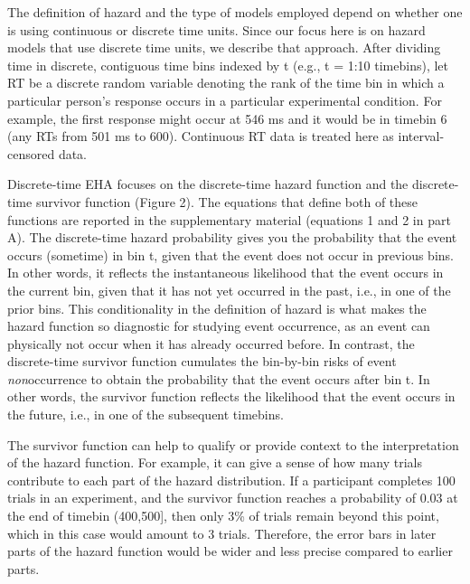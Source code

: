 \documentclass[
  man,floatsintext]{apa6}
\begin{document}
The definition of hazard and the type of models employed depend on whether one is using continuous or discrete time units. Since our focus here is on hazard models that use discrete time units, we describe that approach. After dividing time in discrete, contiguous time bins indexed by t (e.g., t = 1:10 timebins), let RT be a discrete random variable denoting the rank of the time bin in which a particular person's response occurs in a particular experimental condition. For example, the first response might occur at 546 ms and it would be in timebin 6 (any RTs from 501 ms to 600). Continuous RT data is treated here as interval-censored data.

Discrete-time EHA focuses on the discrete-time hazard function and the discrete-time survivor function (Figure 2). The equations that define both of these functions are reported in the supplementary material (equations 1 and 2 in part A). The discrete-time hazard probability gives you the probability that the event occurs (sometime) in bin t, given that the event does not occur in previous bins. In other words, it reflects the instantaneous likelihood that the event occurs in the current bin, given that it has not yet occurred in the past, i.e., in one of the prior bins. This conditionality in the definition of hazard is what makes the hazard function so diagnostic for studying event occurrence, as an event can physically not occur when it has already occurred before. In contrast, the discrete-time survivor function cumulates the bin-by-bin risks of event \emph{non}occurrence to obtain the probability that the event occurs after bin t. In other words, the survivor function reflects the likelihood that the event occurs in the future, i.e., in one of the subsequent timebins.

The survivor function can help to qualify or provide context to the interpretation of the hazard function. For example, it can give a sense of how many trials contribute to each part of the hazard distribution. If a participant completes 100 trials in an experiment, and the survivor function reaches a probability of 0.03 at the end of timebin (400,500{]}, then only 3\% of trials remain beyond this point, which in this case would amount to 3 trials. Therefore, the error bars in later parts of the hazard function would be wider and less precise compared to earlier parts.
\end{document}
